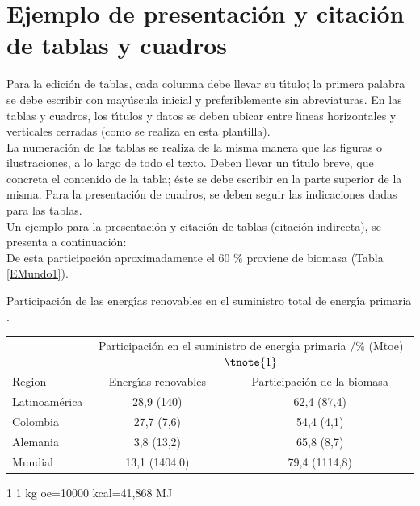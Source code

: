 \section{Ejemplo de presentaci\'{o}n y citaci\'{o}n de tablas y cuadros}
Para la edici\'{o}n de tablas, cada columna debe llevar su t\'{\i}tulo; la primera palabra se debe escribir con may\'{u}scula inicial y preferiblemente sin abreviaturas. En las tablas y cuadros, los t\'{\i}tulos y datos se deben ubicar entre l\'{\i}neas horizontales y verticales cerradas (como se realiza en esta plantilla).\\

La numeraci\'{o}n de las tablas se realiza de la misma manera que las figuras o ilustraciones, a lo largo de todo el texto. Deben llevar un t\'{\i}tulo breve, que concreta el contenido de la tabla; \'{e}ste se debe escribir en la parte superior de la misma. Para la presentaci\'{o}n de cuadros, se deben seguir las indicaciones dadas para las tablas.\\

Un ejemplo para la presentaci\'{o}n y citaci\'{o}n de tablas (citaci\'{o}n indirecta), se presenta a continuaci\'{o}n:\\

De esta participaci\'{o}n aproximadamente el 60 \% proviene de biomasa
(Tabla \ref{EMundo1}).
\begin{center}
\begin{threeparttable}
    \centering%
    \caption{Participaci\'{o}n de las energ\'{\i}as renovables en el suministro total de energ\'{\i}a primaria \cite{AG02i}.}
    \label{EMundo1}
    \begin{tabular}{|l|c|c|}
        \hline
        & \multicolumn{2}{c|}{Participaci\'{o}n en el suministro de energ\'{\i}a primaria /\% (Mtoe)\;$\tnote{1}$}\\
        \cline{2-3}%
        {Region} & Energ\'{\i}as renovables & Participaci\'{o}n de la biomasa\\
        \hline%
        Latinoam\'{e}rica&28,9 (140)&62,4 (87,4)\\
        \hline%
        \:Colombia&27,7 (7,6)&54,4 (4,1)\\
        \hline%
        Alemania&3,8 (13,2)&65,8 (8,7)\\
        \hline%
        Mundial&13,1 (1404,0)&79,4 (1114,8)\\
        \hline
    \end{tabular}
    \begin{tablenotes}
        \item[1] \footnotesize{1 kg oe=10000 kcal=41,868 MJ}
    \end{tablenotes}
\end{threeparttable}
\end{center}

